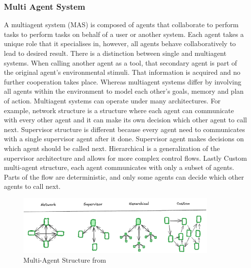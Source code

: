         \subsubsection{Multi Agent System}
        A multiagent system (MAS) is composed of agents that collaborate to perform tasks to perform tasks on behalf of a user or another system. Each agent takes a unique role that it specialises in, however, all agents behave collaboratively to lead to desired result. There is a distinction between single and multiagent systems. When calling another agent as a tool, that secondary agent is part of the original agent's environmental stimuli. That information is acquired and no further cooperation takes place. Whereas multiagent systems differ by involving all agents within the environment to model each other's goals, memory and plan of action. Multiagent systems can operate under many architectures. For example, network structure is a structure where each agent can communicate with every other agent and it can make its own decision which other agent to call next. Supervisor structure is different because every agent need to communicates with a single supervisor agent after it done. Supervisor agent makes decisions on which agent should be called next. Hierarchical is a generalization of the supervisor architecture and allows for more complex control flows. Lastly Custom multi-agent structure, each agent communicates with only a subset of agents. Parts of the flow are deterministic, and only some agents can decide which other agents to call next.
        \cite{Gutowska} \cite{LangGraph}
        \begin{figure}[H]
            \centering
            \includegraphics[width=10cm]{chapters/2/figures/multi-agent.png}
            \caption[Multi-Agent Structure]{Multi-Agent Structure  from~\cite{LangGraph}}
            \label{fig:multi-agent}
        \end{figure}

